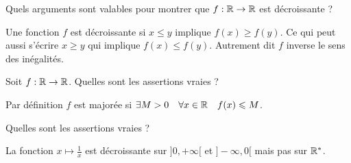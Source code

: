 \begin{question}
Quels arguments sont valables pour montrer que $f : \mathbb{R} \to \mathbb{R}$ est décroissante ?
\begin{answers}



\end{answers}
\begin{explanations}
Une fonction $f$ est décroissante si $x \le y$ implique $f(x) \ge f(y)$.
Ce qui peut aussi s'écrire $x \ge y$ qui implique $f(x) \le f(y)$. 
Autrement dit $f$ inverse le sens des inégalités.
\end{explanations}
\end{question}


\begin{question}
Soit $f : \mathbb{R} \to \mathbb{R}$. Quelles sont les assertions vraies ?
\begin{answers}

    
    
  
\end{answers}
\begin{explanations}
Par définition $f$ est majorée si $\exists  M > 0 \quad \forall x \in \mathbb{R} \quad f(x) \leqslant M$.
\end{explanations}
\end{question}


\begin{question}
Quelles sont les assertions vraies ?
\begin{answers}


    \good{Si $f : \Rr \to ]0,+\infty[$ est croissante, alors $1/f$ est décroissante.}

\end{answers}
\begin{explanations}
La fonction $x \mapsto \frac{1}{x}$ est décroissante sur $]0,+\infty[$ et $]-\infty,0[$ mais pas sur $\mathbb{R}^*$.
\end{explanations}
\end{question}


